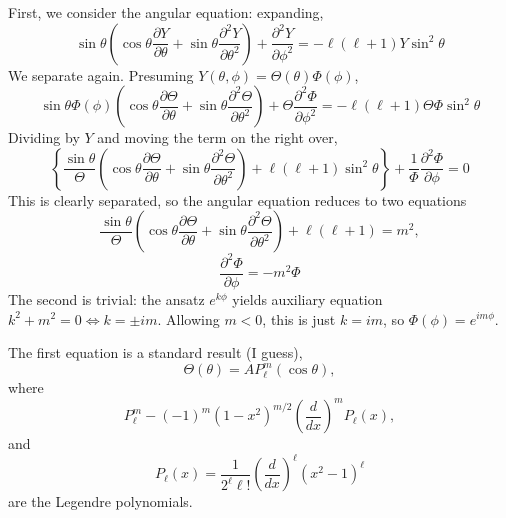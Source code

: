 \documentclass{article}
\begin{document}
First, we consider the angular equation: expanding,
\[
  \sin\theta\left( \cos\theta \frac{\partial Y}{\partial\theta} + \sin\theta\frac{\partial^{2}Y}{\partial\theta^{2}}\right)
  +\frac{\partial^{2}Y}{\partial\phi^{2}} = -\ell(\ell+1)Y\sin^{2}\theta
\]
We separate again.
Presuming $Y(\theta,\phi) = \Theta(\theta)\Phi(\phi)$,
\[
  \sin\theta\Phi(\phi)\left( \cos\theta \frac{\partial \Theta}{\partial\theta} + \sin\theta\frac{\partial^{2}\Theta}{\partial\theta^{2}}\right)
  +\Theta\frac{\partial^{2}\Phi}{\partial \phi^{2}}
  = -\ell(\ell+1)\Theta\Phi\sin^{2}\theta
\]
Dividing by $Y$ and moving the term on the right over,
\[
  \left\{\frac{\sin\theta}{\Theta}\left( \cos\theta \frac{\partial \Theta}{\partial\theta} + \sin\theta\frac{\partial^{2}\Theta}{\partial\theta^{2}}\right)
    +\ell(\ell+1)\sin^{2}\theta\right\}
  + \frac{1}{\Phi}\frac{\partial^{2}\Phi}{\partial\phi}
  =  0
\]
This is clearly separated, so the angular equation reduces to two equations
\[
  \frac{\sin\theta}{\Theta}\left( \cos\theta\frac{\partial\Theta}{\partial\theta}+\sin\theta\frac{\partial^{2}\Theta}{\partial\theta^{2}} \right)
  +\ell(\ell+1) = m^{2},
\]
\[
  \frac{\partial^{2}\Phi}{\partial\phi} = -m^{2}\Phi
\]
The second is trivial: the ansatz $e^{k\phi}$ yields auxiliary equation $k^{2}+m^{2}=0\Leftrightarrow k = \pm im$.
Allowing $m<0$, this is just $k=im$, so $\Phi(\phi) =  e^{im\phi}$.

The first equation is a standard result (I guess),
\[
  \Theta(\theta) = AP_{\ell}^{m}(\cos\theta),
\]
where
\[
  P_{\ell}^{m} - (-1)^{m}\left( 1-x^{2} \right)^{m/2}\left( \frac{d}{dx} \right)^{m}P_{\ell}(x),
\]
and
\[
  P_{\ell}(x) = \frac{1}{2^{\ell}\ell!}\left( \frac{d}{dx} \right)^{\ell}\left( x^{2}-1 \right)^{\ell}
\]
are the Legendre polynomials.
\end{document}
